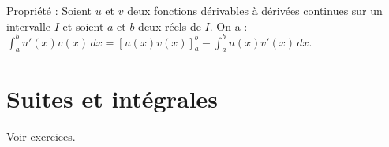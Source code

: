 \documentclass[11pt,a4paper]{article}
\begin{document}
\begin{boiteProp}{Propriété :}
    Soient $u$ et $v$ deux fonctions dérivables à dérivées continues sur un intervalle $I$ et soient $a$ et $b$ deux réels de $I$.
    \newline
    On a : 
    \newline
    $\displaystyle \int_a^b u'(x)v(x) \, dx = [u(x)v(x)]_a^b - \int_a^b u(x)v'(x) \, dx$.
\end{boiteProp}

\section{Suites et intégrales}

Voir exercices.
\end{document}
